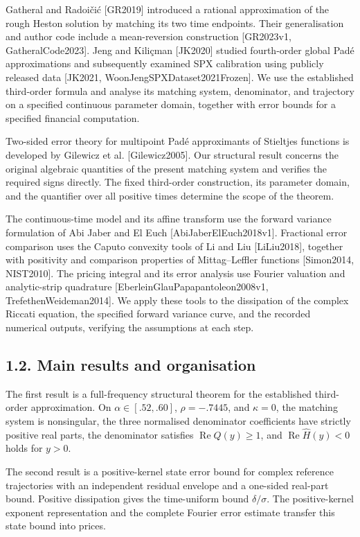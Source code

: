 \documentclass[a4paper,11pt]{article}
\begin{document}
Gatheral and Radoičić [GR2019] introduced a rational approximation of the rough Heston solution by matching its two time endpoints. Their generalisation and author code include a mean-reversion construction [GR2023v1, GatheralCode2023]. Jeng and Kiliçman [JK2020] studied fourth-order global Padé approximations and subsequently examined SPX calibration using publicly released data [JK2021, WoonJengSPXDataset2021Frozen]. We use the established third-order formula and analyse its matching system, denominator, and trajectory on a specified continuous parameter domain, together with error bounds for a specified financial computation.

Two-sided error theory for multipoint Padé approximants of Stieltjes functions is developed by Gilewicz et al. [Gilewicz2005]. Our structural result concerns the original algebraic quantities of the present matching system and verifies the required signs directly. The fixed third-order construction, its parameter domain, and the quantifier over all positive times determine the scope of the theorem.

The continuous-time model and its affine transform use the forward variance formulation of Abi Jaber and El Euch [AbiJaberElEuch2018v1]. Fractional error comparison uses the Caputo convexity tools of Li and Liu [LiLiu2018], together with positivity and comparison properties of Mittag–Leffler functions [Simon2014, NIST2010]. The pricing integral and its error analysis use Fourier valuation and analytic-strip quadrature [EberleinGlauPapapantoleon2008v1, TrefethenWeideman2014]. We apply these tools to the dissipation of the complex Riccati equation, the specified forward variance curve, and the recorded numerical outputs, verifying the assumptions at each step.

\subsection*{1.2. Main results and organisation}

The first result is a full-frequency structural theorem for the established third-order approximation. On \(\alpha\in[.52,.60]\), \(\rho=-.7445\), and \(\kappa=0\), the matching system is nonsingular, the three normalised denominator coefficients have strictly positive real parts, the denominator satisfies \(\operatorname{Re}Q(y)\ge1\), and \(\operatorname{Re}\widehat H(y)<0\) holds for \(y>0\).

The second result is a positive-kernel state error bound for complex reference trajectories with an independent residual envelope and a one-sided real-part bound. Positive dissipation gives the time-uniform bound \(\delta/\sigma\). The positive-kernel exponent representation and the complete Fourier error estimate transfer this state bound into prices.
\end{document}
